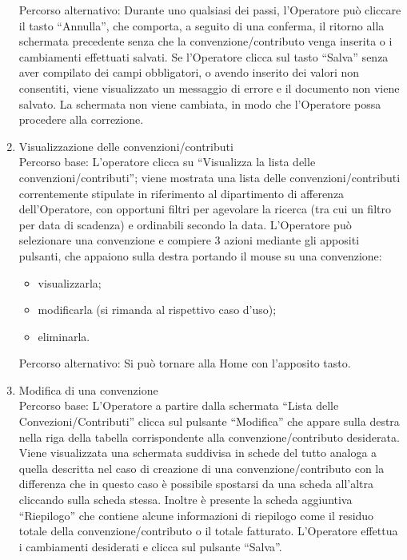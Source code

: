 \begin{enumerate}
  Percorso alternativo:
  Durante uno qualsiasi dei passi, l'Operatore può cliccare il tasto ``Annulla'', che comporta, a seguito di una conferma, il ritorno alla schermata precedente
  senza che la convenzione/contributo venga inserita o i cambiamenti effettuati salvati.
  Se l'Operatore clicca sul tasto ``Salva'' senza aver compilato dei campi obbligatori, o avendo inserito dei valori non consentiti, viene visualizzato un messaggio di errore 
  e il documento non viene salvato. La schermata non viene cambiata, in modo che l'Operatore possa procedere alla correzione.
     
  \item Visualizzazione delle convenzioni/contributi\\

  Percorso base:
  L'operatore clicca su ``Visualizza la lista delle convenzioni/contributi''; viene mostrata una lista delle convenzioni/contributi correntemente stipulate in 
  riferimento al dipartimento di afferenza dell'Operatore, con opportuni filtri 
  per agevolare la ricerca (tra cui un filtro per data di scadenza) e ordinabili secondo la data.
  L'Operatore può selezionare una convenzione e compiere 3 azioni mediante gli appositi pulsanti, che appaiono sulla destra portando il mouse su 
  una convenzione:
  \begin{itemize}
   \item visualizzarla;
   \item modificarla (si rimanda al rispettivo caso d'uso);
   \item eliminarla.
  \end{itemize}		

  Percorso alternativo:
  Si può tornare alla Home con l'apposito tasto.
 
  \item Modifica di una convenzione\\
  
  Percorso base:
  L'Operatore a partire dalla schermata ``Lista delle Convezioni/Contributi'' clicca sul pulsante ``Modifica'' che appare sulla destra nella riga 
  della tabella corrispondente alla convenzione/contributo desiderata. Viene visualizzata una schermata suddivisa in schede del tutto analoga a quella
  descritta nel caso di creazione di una convenzione/contributo con la differenza che in questo caso è possibile spostarsi da una scheda all'altra
  cliccando sulla scheda stessa. Inoltre è presente la scheda aggiuntiva ``Riepilogo'' che contiene alcune informazioni di riepilogo come il residuo
  totale della convenzione/contributo o il totale fatturato.
  L'Operatore effettua i cambiamenti desiderati e clicca sul pulsante ``Salva''.\\


\end{enumerate}
